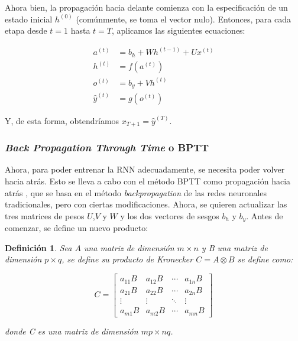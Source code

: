 \documentclass[12pt,twoside]{article}
\newtheorem{definition}[theorem]{Definición}
\begin{document}
Ahora bien, la propagación hacia delante comienza con la especificación de un estado inicial $h^{(0)}$ (comúnmente, se toma el vector nulo). Entonces, para cada etapa desde $t=1$ hasta $t=T$, aplicamos las siguientes ecuaciones: 

\begin{equation}
\begin{aligned}
a^{(t)} &= b_h + W h^{(t-1)} + U x^{(t)} \\
h^{(t)} &= f(a^{(t)}) \\
o^{(t)} &= b_y + V h^{(t)} \\
\hat{y}^{(t)} &= g(o^{(t)})
\end{aligned}
\end{equation}


Y, de esta forma, obtendríamos $x_{T+1}=\hat{y}^{(T)}$.


\subsubsection{\textit{Back Propagation Through Time} o BPTT}\label{sec:16}

Ahora, para poder entrenar la RNN adecuadamente, se necesita poder volver hacia atrás. Esto se lleva a cabo con el método BPTT como propagación hacia atrás \cite{rnn3}, que se basa en el método \textit{backpropagation} de las redes neuronales tradicionales, pero con ciertas modificaciones. Ahora, se quieren actualizar las tres matrices de pesos $U$,$V$ y $W$ y los dos vectores de sesgos $b_h$ y $b_y$. Antes de comenzar, se define un nuevo producto: 

\begin{definition} Sea $A$ una matriz de dimensión $m \times n$ y B una matriz de dimensión $p \times q$, se define su producto de Kronecker $C = A \otimes B$ se define como:

\begin{equation}
C = 
\begin{bmatrix}
a_{11} B & a_{12} B & \cdots & a_{1n} B \\
a_{21} B & a_{22} B & \cdots & a_{2n} B \\
\vdots   & \vdots   & \ddots & \vdots \\
a_{m1} B & a_{m2} B & \cdots & a_{mn} B
\end{bmatrix}
\end{equation}

donde C es una matriz de dimensión $mp \times nq$.
\end{definition}
\end{document}
